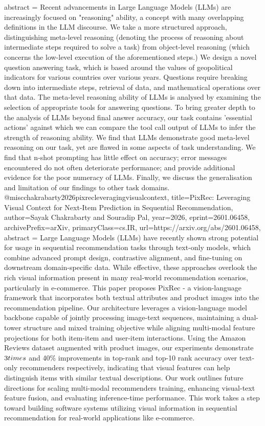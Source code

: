 {      abstract = {Recent advancements in Large Language Models (LLMs) are increasingly focused on "reasoning" ability, a concept with many overlapping definitions in the LLM discourse. We take a more structured approach, distinguishing meta-level reasoning (denoting the process of reasoning about intermediate steps required to solve a task) from object-level reasoning (which concerns the low-level execution of the aforementioned steps.) We design a novel question answering task, which is based around the values of geopolitical indicators for various countries over various years. Questions require breaking down into intermediate steps, retrieval of data, and mathematical operations over that data. The meta-level reasoning ability of LLMs is analysed by examining the selection of appropriate tools for answering questions. To bring greater depth to the analysis of LLMs beyond final answer accuracy, our task contains 'essential actions' against which we can compare the tool call output of LLMs to infer the strength of reasoning ability. We find that LLMs demonstrate good meta-level reasoning on our task, yet are flawed in some aspects of task understanding. We find that n-shot prompting has little effect on accuracy; error messages encountered do not often deteriorate performance; and provide additional evidence for the poor numeracy of LLMs. Finally, we discuss the generalisation and limitation of our findings to other task domains.}
}@misc{chakrabarty2026pixrecleveragingvisualcontext,
      title={PixRec: Leveraging Visual Context for Next-Item Prediction in Sequential Recommendation}, 
      author={Sayak Chakrabarty and Souradip Pal},
      year={2026},
      eprint={2601.06458},
      archivePrefix={arXiv},
      primaryClass={cs.IR},
      url={https://arxiv.org/abs/2601.06458},
      abstract = {Large Language Models (LLMs) have recently shown strong potential for usage in sequential recommendation tasks through text-only models, which combine advanced prompt design, contrastive alignment, and fine-tuning on downstream domain-specific data. While effective, these approaches overlook the rich visual information present in many real-world recommendation scenarios, particularly in e-commerce. This paper proposes PixRec - a vision-language framework that incorporates both textual attributes and product images into the recommendation pipeline. Our architecture leverages a vision-language model backbone capable of jointly processing image-text sequences, maintaining a dual-tower structure and mixed training objective while aligning multi-modal feature projections for both item-item and user-item interactions. Using the Amazon Reviews dataset augmented with product images, our experiments demonstrate $3\\times$ and 40\% improvements in top-rank and top-10 rank accuracy over text-only recommenders respectively, indicating that visual features can help distinguish items with similar textual descriptions. Our work outlines future directions for scaling multi-modal recommenders training, enhancing visual-text feature fusion, and evaluating inference-time performance. This work takes a step toward building software systems utilizing visual information in sequential recommendation for real-world applications like e-commerce.}
}
